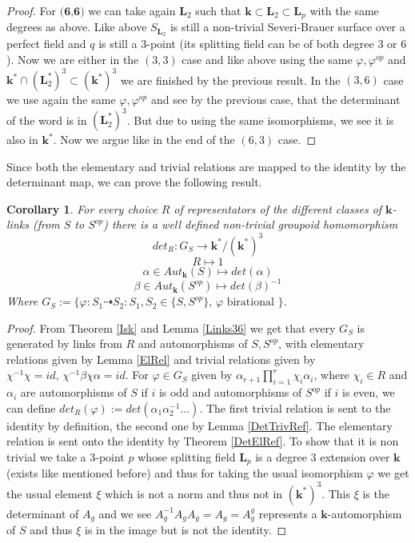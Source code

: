 \documentclass[12pt, oneside, reqno]{amsart}
\newtheorem{corollary}[theorem]{Corollary}
\begin{document}
\begin{proof}
    For $\textbf{(6,6)}$ we can take again $\textbf{L}_2$ such that $\textbf{k} \subset \textbf{L}_2 \subset \textbf{L}_p$ with the same degrees as above. Like above $S_{\textbf{L}_2}$ is still a non-trivial Severi-Brauer surface over a perfect field and $q$ is still a $3$-point (its splitting field can be of both degree $3$ or $6$). Now we are either in the $(3,3)$ case and like above using the same $\varphi, \varphi^{op}$ and $\textbf{k}^* \cap (\textbf{L}_2^{*})^3 \subset (\textbf{k}^{*})^3$ we are finished by the previous result. In the $(3,6)$ case we use again the same $\varphi, \varphi^{op}$ and see by the previous case, that the determinant of the word is in $ (\textbf{L}_2^{*})^3$. But due to using the same isomorphisms, we see it is also in $\textbf{k}^*$. Now we argue like in the end of the $(6,3)$ case.  
\end{proof}
\noindent
Since both the elementary and trivial relations are mapped to the identity by the determinant map, we can prove the following result.
\begin{corollary}\label{DetOnBir}
    For every choice $R$ of representators of the different classes of $\textbf{k}$-links (from $S$ to $S^{op}$) there is a well defined non-trivial groupoid homomorphism \[det_R: G_S \rightarrow \textbf{k}^*/(\textbf{k}^*)^3\] \[R \mapsto 1\] \[\alpha \in Aut_{\textbf{k}}(S) \mapsto det(\alpha)\] \[\beta \in Aut_{\textbf{k}}(S^{op}) \mapsto det(\beta)^{-1}\] Where $G_S := \{ \varphi: S_1 \dashrightarrow S_2 : S_1,S_2 \in \{ S, S^{op}\}, \, \varphi \text{ birational }\}$.
\end{corollary}
\begin{proof}
    From Theorem \ref{Isk} and Lemma \ref{Links36} we get that every $G_S$ is generated by links from $R$ and automorphisms of $S,S^{op}$, with elementary relations given by Lemma \ref{ElRel} and trivial relations given by $\chi^{-1} \chi = id, \, \chi^{-1} \beta \chi \alpha = id$. For $\varphi \in G_S$ given by $\alpha_{r+1}\prod_{i=1}^r\chi_i \alpha_i$, where $\chi_i \in R$ and $\alpha_i$ are automorphisms of $S$ if $i$ is odd and automorphisms of $S^{op}$ if $i$ is even, we can define $det_R(\varphi) := det(\alpha_1 \alpha_2^{-1} \dots )$. The first trivial relation is sent to the identity by definition, the second one by Lemma \ref{DetTrivRef}. The elementary relation is sent onto the identity by Theorem \ref{DetElRef}. To show that it is non trivial we take a $3$-point $p$ whose splitting field $\textbf{L}_p$ is a degree $3$ extension over $\textbf{k}$ (exists like mentioned before) and thus for taking the usual isomorphism $\varphi$ we get the usual element $\xi$ which is not a norm and thus not in $(\textbf{k}^*)^3$. This $\xi$ is the determinant of $A_g$ and we see $A_g^{-1} A_g A_g = A_g = A_g^g$ represents a $\textbf{k}$-automorphism of $S$ and thus $\xi$ is in the image but is not the identity. 
\end{proof}
\end{document}
